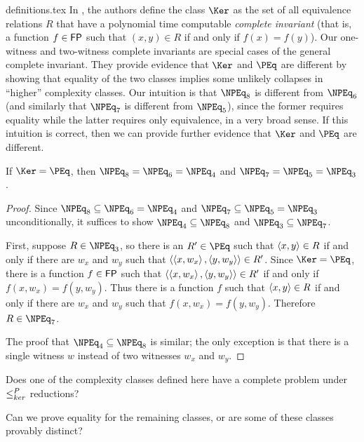 \begin{filecontents}{definitions.tex}
In \cite{fg11}, the authors define the class $\Ker$ as the set of all equivalence relations $R$ that have a polynomial time computable \emph{complete invariant} (that is, a function $f \in \FP$ such that $(x, y) \in R$ if and only if $f(x) = f(y)$).
Our one-witness and two-witness complete invariants are special cases of the general complete invariant.
They provide evidence that $\Ker$ and $\PEq$ are different by showing that equality of the two classes implies some unlikely collapses in ``higher'' complexity classes.
Our intuition is that $\NPEq_8$ is different from $\NPEq_6$ (and similarly that $\NPEq_7$ is different from $\NPEq_5$), since the former requires equality while the latter requires only equivalence, in a very broad sense.
If this intuition is correct, then we can provide further evidence that $\Ker$ and $\PEq$ are different.

\begin{theorem}
  If $\Ker = \PEq$, then $\NPEq_8 = \NPEq_6 = \NPEq_4$ and $\NPEq_7 = \NPEq_5 = \NPEq_3$.
\end{theorem}
\begin{proof}
  Since $\NPEq_8 \subseteq \NPEq_6 = \NPEq_4$ and $\NPEq_7 \subseteq \NPEq_5 = \NPEq_3$ unconditionally, it suffices to show $\NPEq_4 \subseteq \NPEq_8$ and $\NPEq_3 \subseteq \NPEq_7$.

  First, suppose $R \in \NPEq_3$, so there is an $R' \in \PEq$ such that $\pair{x}{y} \in R$ if and only if there are $w_x$ and $w_y$ such that $\pair{\pair{x}{w_x}}{\pair{y}{w_y}} \in R'$.
  Since $\Ker = \PEq$, there is a function $f \in \FP$ such that $\pair{\pair{x}{w_x}}{\pair{y}{w_y}} \in R'$ if and only if $f(x, w_x) = f(y, w_y)$.
  Thus there is a function $f$ such that $\pair{x}{y} \in R$ if and only if there are $w_x$ and $w_y$ such that $f(x, w_x) = f(y, w_y)$.
  Therefore $R \in \NPEq_7$.

  The proof that $\NPEq_4 \subseteq \NPEq_8$ is similar; the only exception is that there is a single witness $w$ instead of two witnesses $w_x$ and $w_y$.
\end{proof}

\begin{openquestion}
  Does one of the complexity classes defined here have a complete problem under $\kr$ reductions?
\end{openquestion}
\begin{openquestion}
  Can we prove equality for the remaining classes, or are some of these classes provably distinct?
\end{openquestion}
\end{filecontents}
